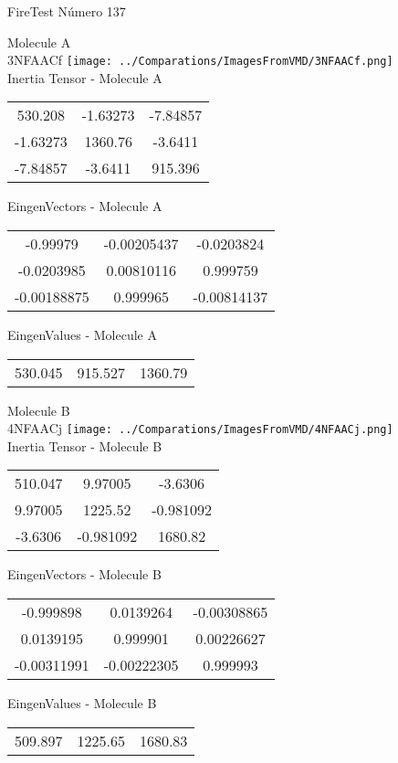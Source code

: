 \vtab[-2cm]
\begin{center}
{\large FireTest \tab Número 137}
\end{center}
\begin{multicols}{2}
\begin{center}

Molecule A \\ 
3NFAACf
\texttt{[image: ../Comparations/ImagesFromVMD/3NFAACf.png]}
\\
Inertia Tensor - Molecule A \\
\vtab

\begin{tabular}{|c c c|}
530.208	 & 	-1.63273	 & 	-7.84857	 \\
-1.63273	 & 	1360.76	 & 	-3.6411	 \\
-7.84857	 & 	-3.6411	 & 	915.396
\end{tabular}

\vtab
 EingenVectors - Molecule A     \\
\vtab
\begin{tabular}{|c c c|}
-0.99979	 & 	-0.00205437	 & 	-0.0203824	 \\
-0.0203985	 & 	0.00810116	 & 	0.999759	 \\
-0.00188875	 & 	0.999965	 & 	-0.00814137
\end{tabular}

\vtab
 EingenValues - Molecule A     \\
\vtab
\begin{tabular}{|c c c|}
530.045	 & 	915.527	 & 	1360.79	 \\
\end{tabular}
\columnbreak

Molecule B \\ 
4NFAACj
\texttt{[image: ../Comparations/ImagesFromVMD/4NFAACj.png]}
\\
Inertia Tensor - Molecule B \\
\vtab

\begin{tabular}{|c c c|}
510.047	 & 	9.97005	 & 	-3.6306	 \\
9.97005	 & 	1225.52	 & 	-0.981092	 \\
-3.6306	 & 	-0.981092	 & 	1680.82
\end{tabular}

\vtab
 EingenVectors - Molecule B     \\
\vtab
\begin{tabular}{|c c c|}
-0.999898	 & 	0.0139264	 & 	-0.00308865	 \\
0.0139195	 & 	0.999901	 & 	0.00226627	 \\
-0.00311991	 & 	-0.00222305	 & 	0.999993
\end{tabular}

\vtab
 EingenValues - Molecule B     \\
\vtab
\begin{tabular}{|c c c|}
509.897	 & 	1225.65	 & 	1680.83	 \\
\end{tabular}

\end{center}
\end{multicols}
